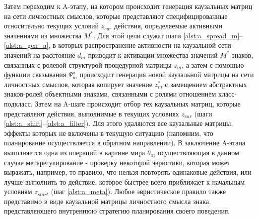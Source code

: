 \documentclass[12pt]{report}
\begin{document}
	\begin{algorithm}
		\begin{algorithmic}[1]
			
		\end{algorithmic}
	\end{algorithm}
	
	Затем переходим к A-этапу, на котором происходит генерация каузальных матриц на сети личностных смыслов, которые представляют специфицированные относительно текущих условий $z_{cur}$ действия, определяемые активными значениями из множества $M^*$. Для этой цели служат шаги \ref{alst:a_spread_m}--\ref{alst:a_gen_a}, в которых распространение активности на каузальной сети значений на расстояние $d_m$ приводит к активации множества значений $M^*$ знаков, связанных с ролевой структурой процедурной матрицы $z_m$, а затем с помощью функции связывания $\Psi_m^a$ происходит генерация новой каузальной матрицы на сети личностных смыслов, которая копирует значение $z_m^*$ с замещением абстрактных знаков-ролей объектными знаками, связанными с ролями отношением класс-подкласс. Затем на A-шаге происходит отбор тех каузальных матриц, которые представляют действия, выполнимые в текущих условиях $z_{cur}$ (шаги \ref{alst:a_shift}--\ref{alst:a_filter}). Для этого удаляются все каузальные матрицы, эффекты которых не включены в текущую ситуацию (напомним, что планирование осуществляется в обратном направлении). В заключение A-этапа выполняется одна из операций в картине мира $\theta_a$, осуществляющая в данном случае метарегулирование - проверку некоторой эвристики, которая может выражать, например, то правило, что нельзя повторять одинаковые действия, или лучше выполнить то действие, которое быстрее всего приближает к начальным условиям $z_{start}$ (шаг \ref{alst:a_meta}). Любое эвристическое правило также представимо в виде каузальной матрицы личностного смысла знака, представляющего внутреннюю стратегию планирования своего поведения.
		
	\begin{algorithm}
		\begin{algorithmic}[1]
			\algrestore{algst:store3}
			
			\algstore{algst:store4}
		\end{algorithmic}
	\end{algorithm}
	
\end{document}
